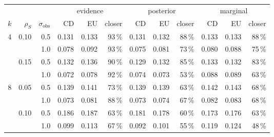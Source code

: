 \footnotesize\setlength{\tabcolsep}{4.5pt}
\begin{tabular}{rrrrrrrrrrrr}
\toprule
& & & \multicolumn{3}{c}{evidence} & \multicolumn{3}{c}{posterior} & \multicolumn{3}{c}{marginal} \\ \cmidrule(lr){4-6}\cmidrule(lr){7-9}\cmidrule(l){10-12}
$k$ & $\rho_S$ & $\sigma_{\mathrm{obs}}$ & CD & EU & closer & CD & EU & closer & CD & EU & closer \\
\midrule
4 & 0.10 & 0.5 & 0.131 & 0.133 & 93\,\% & 0.131 & 0.132 & 88\,\% & 0.133 & 0.133 & 88\,\% \\
 &  & 1.0 & 0.078 & 0.092 & 93\,\% & 0.075 & 0.081 & 73\,\% & 0.080 & 0.088 & 75\,\% \\
 & 0.15 & 0.5 & 0.132 & 0.136 & 90\,\% & 0.129 & 0.132 & 85\,\% & 0.133 & 0.132 & 83\,\% \\
 &  & 1.0 & 0.072 & 0.078 & 92\,\% & 0.074 & 0.073 & 53\,\% & 0.088 & 0.089 & 63\,\% \\
8 & 0.05 & 0.5 & 0.139 & 0.141 & 73\,\% & 0.139 & 0.139 & 63\,\% & 0.142 & 0.143 & 68\,\% \\
 &  & 1.0 & 0.073 & 0.081 & 88\,\% & 0.073 & 0.074 & 67\,\% & 0.082 & 0.083 & 68\,\% \\
 & 0.10 & 0.5 & 0.186 & 0.187 & 63\,\% & 0.181 & 0.178 & 60\,\% & 0.173 & 0.176 & 63\,\% \\
 &  & 1.0 & 0.099 & 0.113 & 67\,\% & 0.092 & 0.101 & 55\,\% & 0.119 & 0.124 & 48\,\% \\
\bottomrule
\end{tabular}
